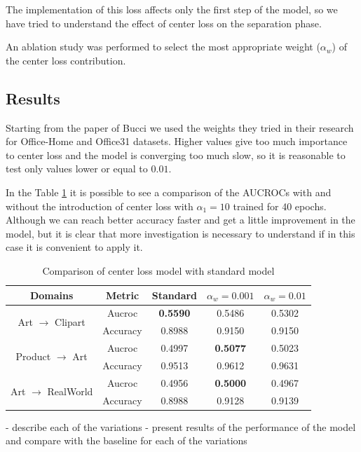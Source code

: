 \documentclass[10pt,twocolumn,letterpaper]{article}
\begin{document}
The implementation of this loss affects only the first step of the model, so we have tried to understand the effect of center loss on the separation phase.

An ablation study was performed to select the most appropriate weight ($\alpha_w$) of the center loss contribution.

\subsection*{Results}

Starting from the paper of Bucci \etal \cite{Bucci2020} we used the weights they tried in their research for Office-Home and Office31 datasets. Higher values give too much importance to center loss and the model is converging too much slow, so it is reasonable to test only values lower or equal to $0.01$.

In the Table \ref{tab:center_loss} it is possible to see a comparison of the AUCROCs with and without the introduction of center loss with $\alpha_1 = 10$ trained for 40 epochs. Although we can reach better accuracy faster and get a little improvement in the model, but it is clear that more investigation is necessary to understand if in this case it is convenient to apply it. 

\begin{table}
	\centering
	\small
	\begin{tabular}{|c|c|c|c|c|}
		\hline
		Domains & Metric & Standard & $\alpha_w = 0.001$ & $\alpha_w = 0.01$\\
		\hline
		\multirow{2}{*}{Art $\to$ Clipart}
		& Aucroc & \textbf{0.5590} & 0.5486 & 0.5302\\ 
		& Accuracy & 0.8988 & 0.9150 & 0.9150\\
		\hline
		\multirow{2}{*}{Product $\to$ Art}
		& Aucroc & 0.4997 & \textbf{0.5077} & 0.5023\\ 
		& Accuracy & 0.9513 & 0.9612 & 0.9631\\
		\hline
		\multirow{2}{*}{Art $\to$ RealWorld}
		& Aucroc & 0.4956 & \textbf{0.5000} & 0.4967\\ 
		& Accuracy & 0.8988 & 0.9128 & 0.9139\\
		\hline
	\end{tabular}
	\caption{Comparison of center loss model with standard model}
	\label{tab:center_loss}
\end{table}


- describe each of the variations
- present results of the performance of the model and compare with the baseline for each of the variations
\end{document}
